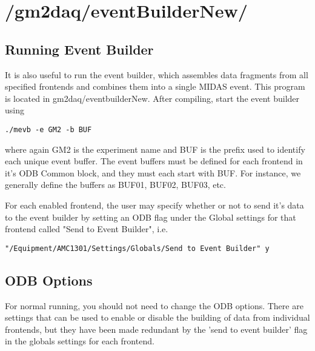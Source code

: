 \section{/gm2daq/eventBuilderNew/}

\subsection{Running Event Builder}

It is also useful to run the event builder, which assembles data fragments from all specified frontends and combines them into a single MIDAS event. This program is located in gm2daq/eventbuilderNew. After compiling, start the event builder using

\begin{verbatim}
./mevb -e GM2 -b BUF
\end{verbatim}

where again GM2 is the experiment name and BUF is the prefix used to identify each unique event buffer. The event buffers must be defined for each frontend in it's ODB Common block, and they must each start with BUF. For instance, we generally define the buffers as BUF01, BUF02, BUF03, etc. 

For each enabled frontend, the user may specify whether or not to send it's data to the event builder by setting an ODB flag under the Global settings for that frontend called "Send to Event Builder", i.e.

\begin{verbatim}
"/Equipment/AMC1301/Settings/Globals/Send to Event Builder" y
\end{verbatim}

\subsection{ODB Options}

For normal running, you should not need to change the ODB options. There are settings that can be used to enable or disable the building of data from individual frontends, but they have been made redundant by the 'send to event builder' flag in the globals settings for each frontend.